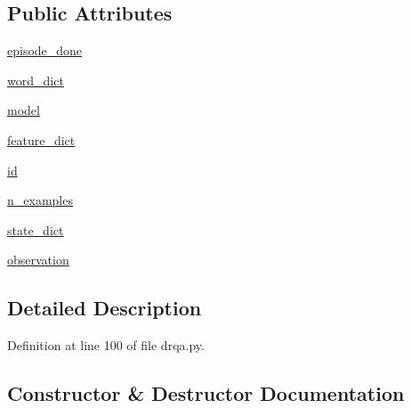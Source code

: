 \subsection*{Public Attributes}
\begin{DoxyCompactItemize}
\item 
\hyperlink{classparlai_1_1agents_1_1drqa_1_1drqa_1_1DrqaAgent_a313e13a6e6d878e5e37c5d27d8daed78}{episode\+\_\+done}
\item 
\hyperlink{classparlai_1_1agents_1_1drqa_1_1drqa_1_1DrqaAgent_aa49b71f40d0e4fb91062cab736f49146}{word\+\_\+dict}
\item 
\hyperlink{classparlai_1_1agents_1_1drqa_1_1drqa_1_1DrqaAgent_a4b32188969b359bb5b9e28766388a26e}{model}
\item 
\hyperlink{classparlai_1_1agents_1_1drqa_1_1drqa_1_1DrqaAgent_aad3576cea9fa96bdb5bf3d9a6209c93c}{feature\+\_\+dict}
\item 
\hyperlink{classparlai_1_1agents_1_1drqa_1_1drqa_1_1DrqaAgent_ac7b97d4092ac9dd221214832416b2002}{id}
\item 
\hyperlink{classparlai_1_1agents_1_1drqa_1_1drqa_1_1DrqaAgent_ac578c65b199b2d4115ee674fc93bb6a6}{n\+\_\+examples}
\item 
\hyperlink{classparlai_1_1agents_1_1drqa_1_1drqa_1_1DrqaAgent_a425092eeec6b948bcd9ed4765f6a4afc}{state\+\_\+dict}
\item 
\hyperlink{classparlai_1_1agents_1_1drqa_1_1drqa_1_1DrqaAgent_a31b47287b8b175d851b897aef7837990}{observation}
\end{DoxyCompactItemize}


\subsection{Detailed Description}


Definition at line 100 of file drqa.\+py.



\subsection{Constructor \& Destructor Documentation}
\mbox{\label{classparlai_1_1agents_1_1drqa_1_1drqa_1_1DrqaAgent_ab4fc521d734a88ec24fcc8ebb478fd11}} 
